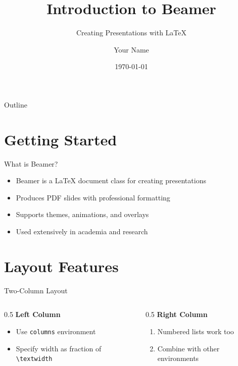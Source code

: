 \documentclass[aspectratio=169]{beamer}
\title{Introduction to Beamer}
\subtitle{Creating Presentations with \LaTeX{}}
\author{Your Name}
\institute{Your University}
\date{\today}
\begin{document}
\begin{frame}
\titlepage
\end{frame}

\begin{frame}{Outline}
\tableofcontents
\end{frame}

\section{Getting Started}

\begin{frame}{What is Beamer?}
\begin{itemize}
    \item Beamer is a \LaTeX{} document class for creating presentations
    \item Produces PDF slides with professional formatting
    \item Supports themes, animations, and overlays
    \item Used extensively in academia and research
\end{itemize}
\end{frame}

\section{Layout Features}

\begin{frame}{Two-Column Layout}
\begin{columns}
    \begin{column}{0.5\textwidth}
        \textbf{Left Column}
        \begin{itemize}
            \item Use \texttt{columns} environment
            \item Specify width as fraction of \texttt{\textbackslash textwidth}
        \end{itemize}
    \end{column}
    \begin{column}{0.5\textwidth}
        \textbf{Right Column}
        \begin{enumerate}
            \item Numbered lists work too
            \item Combine with other environments
        \end{enumerate}
    \end{column}
\end{columns}
\end{frame}
\end{document}
